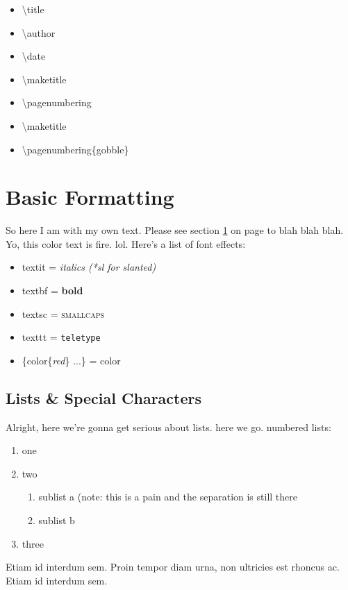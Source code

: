 \documentclass[a4paper,12pt]{article} %
\begin{document}
\begin{itemize}
\itemsep=-0.5em
\item \textbackslash title
\item \textbackslash author
\item \textbackslash date
\item \textbackslash maketitle
\item \textbackslash pagenumbering
\item \textbackslash maketitle
\item \textbackslash pagenumbering\{gobble\}

\end{itemize}



\newpage
\onecolumn

\section{Basic Formatting} \label{Basic Formatting}
So here I am with my own text. Please see section \ref{Basic Formatting} on page \pageref{Basic Formatting} to blah blah blah. Yo, this color text is {\color{red}fire}. lol. Here's a list of font effects:
\begin{itemize}
\itemsep=-0.5em %
\item textit = \textit{italics (*sl for \textsl{slanted})}
\item textbf = \textbf{bold}
\item textsc = \textsc{smallcaps}
\item texttt = \texttt{teletype}
\item \{color\{\textit{red}\} ...\} = {\color{red} color}
\end{itemize}

\subsection{Lists \& Special Characters}
Alright, here we're gonna get serious about lists. here we go. numbered lists:
\begin{enumerate}
\itemsep=-0.5em %
\item one
\item two
\begin{enumerate}
\item sublist a (note: this is a pain and the separation is still there
\item sublist b
\end{enumerate}
\item three
\end{enumerate}
Etiam id interdum sem. Proin tempor diam urna, non ultricies est rhoncus ac. Etiam id interdum sem.
\end{document}

